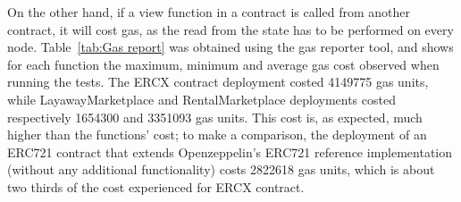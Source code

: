 \documentclass[english, LaM, oneside]{sapthesis}%
\begin{document}
On the other hand, if a view function in a contract is called from another contract, it will cost gas, as the read from the state has to be performed on every node. \newline
Table~\ref{tab:Gas report} was obtained using the gas reporter tool, and shows for each function the maximum, minimum and average gas cost observed when running the tests.\newline
The ERCX contract deployment costed 4149775 gas units, while LayawayMarketplace and RentalMarketplace deployments costed respectively 1654300 and 3351093 gas units. This cost is, as expected, much higher than the functions' cost; to make a comparison, the deployment of an ERC721 contract that extends Openzeppelin's ERC721 reference implementation (without any additional functionality) costs 2822618 gas units, which is about two thirds of the cost experienced for ERCX contract.
\end{document}
